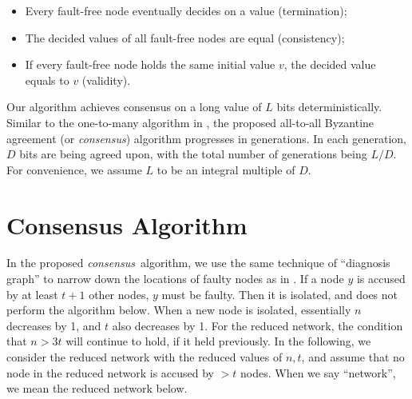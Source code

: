 \documentclass[12pt]{article}
\begin{document}
\begin{itemize}
\item Every fault-free node eventually decides on a value (termination);
\item The decided values of all fault-free nodes are equal (consistency);
\item If every fault-free node holds the same initial value $v$, the decided value equals to $v$ (validity).
\end{itemize}


Our algorithm achieves consensus on a long value of $L$ bits deterministically. Similar to the one-to-many algorithm in \cite{techreport_BA_complexity}, the proposed all-to-all Byzantine agreement (or {\em consensus})
 algorithm  progresses in generations. In each generation, $D$ bits are being agreed upon, with the total number of generations being $L/D$.
For convenience, we assume $L$ to be an integral multiple of $D$.

\section{Consensus Algorithm}\label{sec:algorithm}
In the proposed {\em consensus}\, algorithm, we use the same technique of ``diagnosis graph'' to narrow down the locations of faulty nodes as in \cite{techreport_BA_complexity}. If a node $y$ is accused by at least $t+1$ other nodes, $y$ must be faulty. Then it is isolated,
and does not perform the algorithm below. When a new node is isolated,
essentially $n$ decreases by 1, and $t$ also decreases by 1. For the
reduced network, the condition that $n>3t$ will continue to hold, if
it held previously. In the
following, we consider the reduced network with the reduced values of
$n,t$, and assume that no node in the reduced network is accused by $>t$ nodes.
When we say ``network'', we mean the reduced network below.
\end{document}
